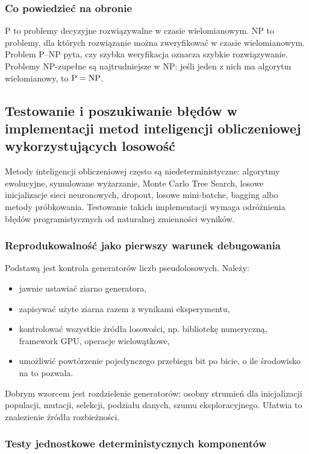 \subsubsection{Co powiedzieć na obronie}

P to problemy decyzyjne rozwiązywalne w czasie wielomianowym. NP to problemy, dla których rozwiązanie można zweryfikować w czasie wielomianowym. Problem P--NP pyta, czy szybka weryfikacja oznacza szybkie rozwiązywanie. Problemy NP-zupełne są najtrudniejsze w NP: jeśli jeden z nich ma algorytm wielomianowy, to $\mathrm{P}=\mathrm{NP}$.

\subsection{Testowanie i poszukiwanie błędów w implementacji metod inteligencji obliczeniowej wykorzystujących losowość}

Metody inteligencji obliczeniowej często są niedeterministyczne: algorytmy ewolucyjne, symulowane wyżarzanie, Monte Carlo Tree Search, losowe inicjalizacje sieci neuronowych, dropout, losowe mini-batche, bagging albo metody próbkowania. Testowanie takich implementacji wymaga odróżnienia błędów programistycznych od naturalnej zmienności wyników.

\subsubsection{Reprodukowalność jako pierwszy warunek debugowania}

Podstawą jest kontrola generatorów liczb pseudolosowych. Należy:
\begin{itemize}
  \item jawnie ustawiać ziarno generatora,
  \item zapisywać użyte ziarna razem z wynikami eksperymentu,
  \item kontrolować wszystkie źródła losowości, np. bibliotekę numeryczną, framework GPU, operacje wielowątkowe,
  \item umożliwić powtórzenie pojedynczego przebiegu bit po bicie, o ile środowisko na to pozwala.
\end{itemize}

Dobrym wzorcem jest rozdzielenie generatorów: osobny strumień dla inicjalizacji populacji, mutacji, selekcji, podziału danych, szumu eksploracyjnego. Ułatwia to znalezienie źródła rozbieżności.

\subsubsection{Testy jednostkowe deterministycznych komponentów}

